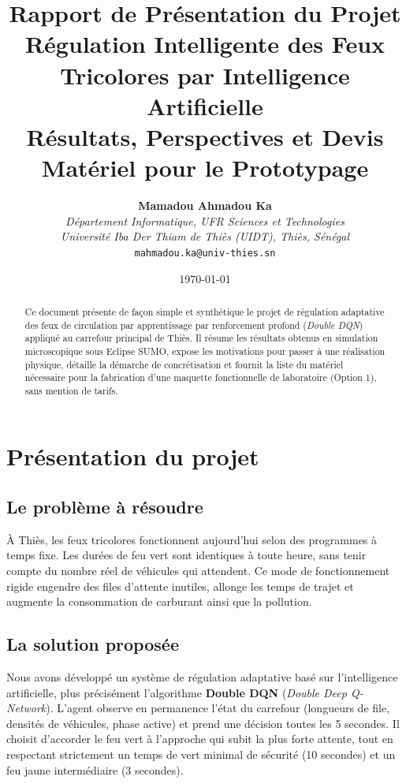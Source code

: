 \documentclass[11pt,a4paper]{article}
\title{\textbf{\LARGE Rapport de Présentation du Projet}\\[0.3cm]
\Large Régulation Intelligente des Feux Tricolores par Intelligence Artificielle\\[0.15cm]
\normalsize Résultats, Perspectives et Devis Matériel pour le Prototypage}
\author{\textbf{Mamadou Ahmadou Ka}\\[0.1cm]
\textit{Département Informatique, UFR Sciences et Technologies}\\
\textit{Université Iba Der Thiam de Thiès (UIDT), Thiès, Sénégal}\\
\texttt{mahmadou.ka@univ-thies.sn}}
\date{\today}
\begin{document}
\maketitle
\thispagestyle{empty}

\begin{abstract}
Ce document présente de façon simple et synthétique le projet de régulation adaptative des feux de circulation par apprentissage par renforcement profond (\emph{Double DQN}) appliqué au carrefour principal de Thiès. Il résume les résultats obtenus en simulation microscopique sous Eclipse SUMO, expose les motivations pour passer à une réalisation physique, détaille la démarche de concrétisation et fournit la liste du matériel nécessaire pour la fabrication d'une maquette fonctionnelle de laboratoire (Option 1), sans mention de tarifs.
\end{abstract}

\vspace{0.4cm}

\section{Présentation du projet}

\subsection{Le problème à résoudre}
À Thiès, les feux tricolores fonctionnent aujourd'hui selon des programmes à temps fixe. Les durées de feu vert sont identiques à toute heure, sans tenir compte du nombre réel de véhicules qui attendent. Ce mode de fonctionnement rigide engendre des files d'attente inutiles, allonge les temps de trajet et augmente la consommation de carburant ainsi que la pollution.

\subsection{La solution proposée}
Nous avons développé un système de régulation adaptative basé sur l'intelligence artificielle, plus précisément l'algorithme \textbf{Double DQN} (\emph{Double Deep Q-Network}). L'agent observe en permanence l'état du carrefour (longueurs de file, densités de véhicules, phase active) et prend une décision toutes les 5 secondes. Il choisit d'accorder le feu vert à l'approche qui subit la plus forte attente, tout en respectant strictement un temps de vert minimal de sécurité (10 secondes) et un feu jaune intermédiaire (3 secondes).
\end{document}
